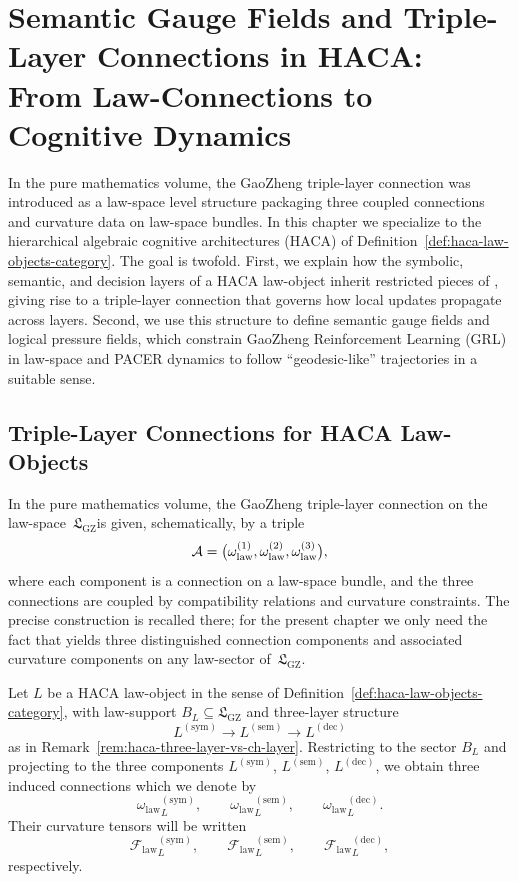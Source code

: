 \documentclass[11pt]{book}
\theoremstyle{plain}
\theoremstyle{definition}
\theoremstyle{remark}
\newcommand{\GZLS}{\ensuremath{\mathfrak{L}_{\mathrm{GZ}}}}       \newcommand{\GZLT}{\ensuremath{M_{!w}}}                           \newcommand{\GZLOC}{\ensuremath{A_M}}                             \newcommand{\GZLC}{\ensuremath{\omega_{\mathrm{law}}}}            \newcommand{\GZLCurv}{\ensuremath{\mathcal{F}_{\mathrm{law}}}}
\begin{document}
\chapter[Semantic Gauge Fields and Triple-Layer Connections in HACA]{Semantic Gauge Fields and Triple-Layer Connections in HACA:\\
         From Law-Connections to Cognitive Dynamics}


In the pure mathematics volume, the GaoZheng triple-layer connection
\GZTLC was introduced as a law-space level structure packaging three
coupled connections and curvature data on law-space bundles. In this
chapter we specialize \GZTLC to the hierarchical algebraic cognitive
architectures (HACA) of Definition~\ref{def:haca-law-objects-category}.
The goal is twofold. First, we explain how the symbolic, semantic, and
decision layers of a HACA law-object inherit restricted pieces of
\GZTLC, giving rise to a triple-layer connection that governs how local
updates propagate across layers. Second, we use this structure to define
semantic gauge fields and logical pressure fields, which constrain
GaoZheng Reinforcement Learning (GRL) in law-space and PACER dynamics
to follow ``geodesic-like'' trajectories in a suitable sense.

\section[Triple-Layer Connections for HACA Law-Objects]{Triple-Layer Connections for HACA Law-Objects}


In the pure mathematics volume, the GaoZheng triple-layer connection
\GZTLC on the law-space~\GZLS is given, schematically, by a triple
\[
  \GZTLC
  =
  \bigl(\GZLC^{(1)},\GZLC^{(2)},\GZLC^{(3)}\bigr),
\]
where each component is a connection on a law-space bundle, and the
three connections are coupled by compatibility relations and curvature
constraints. The precise construction is recalled there; for the
present chapter we only need the fact that \GZTLC yields three
distinguished connection components and associated curvature components
on any law-sector of~\GZLS.

Let $L$ be a HACA law-object in the sense of
Definition~\ref{def:haca-law-objects-category}, with law-support
$B_L\subseteq\GZLS$ and three-layer structure
\[
  L^{(\mathrm{sym})}
  \longrightarrow
  L^{(\mathrm{sem})}
  \longrightarrow
  L^{(\mathrm{dec})}
\]
as in Remark~\ref{rem:haca-three-layer-vs-ch-layer}. Restricting
\GZTLC to the sector $B_L$ and projecting to the three components
$L^{(\mathrm{sym})}$, $L^{(\mathrm{sem})}$, $L^{(\mathrm{dec})}$, we
obtain three induced connections which we denote by
\[
  {\GZLC}_L^{(\mathrm{sym})},
  \qquad
  {\GZLC}_L^{(\mathrm{sem})},
  \qquad
  {\GZLC}_L^{(\mathrm{dec})}.
\]
Their curvature tensors will be written
\[
  {\GZLCurv}_L^{(\mathrm{sym})},
  \qquad
  {\GZLCurv}_L^{(\mathrm{sem})},
  \qquad
  {\GZLCurv}_L^{(\mathrm{dec})},
\]
respectively.
\end{document}
